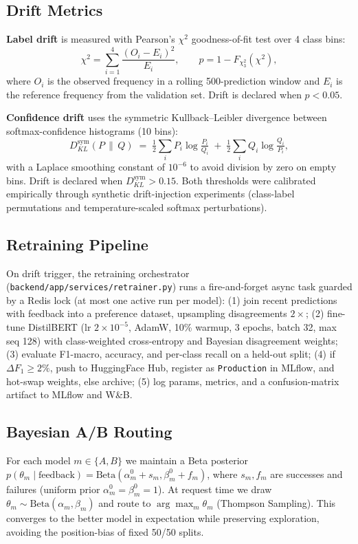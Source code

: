 \documentclass[11pt, a4paper]{article}
\begin{document}
\subsection{Drift Metrics}

\textbf{Label drift} is measured with Pearson's $\chi^2$ goodness-of-fit test over 4 class bins:
\[
\chi^2 = \sum_{i=1}^{4} \frac{(O_i - E_i)^2}{E_i}, \qquad p = 1 - F_{\chi^2_3}(\chi^2),
\]
where $O_i$ is the observed frequency in a rolling 500-prediction window and $E_i$ is the reference frequency from the validation set. Drift is declared when $p < 0.05$.

\textbf{Confidence drift} uses the symmetric Kullback--Leibler divergence between softmax-confidence histograms (10 bins):
\[
D_{KL}^{\text{sym}}(P \,\|\, Q) \;=\; \tfrac{1}{2}\sum_{i} P_i \log\!\tfrac{P_i}{Q_i} \;+\; \tfrac{1}{2}\sum_{i} Q_i \log\!\tfrac{Q_i}{P_i},
\]
with a Laplace smoothing constant of $10^{-6}$ to avoid division by zero on empty bins. Drift is declared when $D_{KL}^{\text{sym}} > 0.15$. Both thresholds were calibrated empirically through synthetic drift-injection experiments (class-label permutations and temperature-scaled softmax perturbations).

\subsection{Retraining Pipeline}

On drift trigger, the retraining orchestrator (\texttt{backend/app/services/retrainer.py}) runs a fire-and-forget async task guarded by a Redis lock (at most one active run per model): (1) join recent predictions with feedback into a preference dataset, upsampling disagreements $2\times$; (2) fine-tune DistilBERT (lr $2\!\times\!10^{-5}$, AdamW, 10\% warmup, 3 epochs, batch 32, max seq 128) with class-weighted cross-entropy and Bayesian disagreement weights; (3) evaluate F1-macro, accuracy, and per-class recall on a held-out split; (4) if $\Delta F_1 \geq 2\%$, push to HuggingFace Hub, register as \texttt{Production} in MLflow, and hot-swap weights, else archive; (5) log params, metrics, and a confusion-matrix artifact to MLflow and W\&B.

\subsection{Bayesian A/B Routing}

For each model $m \in \{A, B\}$ we maintain a Beta posterior $p(\theta_m \mid \text{feedback}) = \text{Beta}(\alpha_m^0 + s_m, \beta_m^0 + f_m)$, where $s_m, f_m$ are successes and failures (uniform prior $\alpha_m^0 = \beta_m^0 = 1$). At request time we draw $\theta_m \sim \text{Beta}(\alpha_m, \beta_m)$ and route to $\arg\max_m \theta_m$ (Thompson Sampling). This converges to the better model in expectation while preserving exploration, avoiding the position-bias of fixed 50/50 splits.
\end{document}
